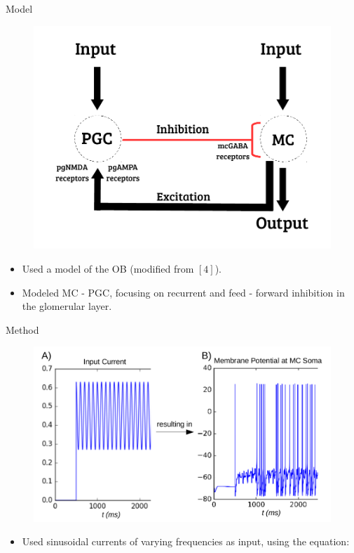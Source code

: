 \documentclass[final,hyperref={pdfpagelabels=false}]{beamer}
\begin{document}
\begin{frame}{}
\begin{columns}[t]
\begin{column}{.48\linewidth}
\begin{block}{Model} 
\begin{figure}
\center
\includegraphics[scale=0.6]{images/Circuit_Diagram}
\end{figure}
\begin{itemize}
\item Used a model of the OB (modified from $[4]$).
\item Modeled MC - PGC, focusing on recurrent and feed - forward inhibition in the glomerular layer.
\end{itemize}
\end{block}
\begin{block}{Method} 
\begin{figure}
\center
\includegraphics[scale=0.5]{images/Figure2AB}
\end{figure}
\begin{itemize}
\item Used sinusoidal currents of varying frequencies as input, using the equation:

\end{itemize}
\end{block}
\end{column}
\end{columns}
\end{frame}
\end{document}
